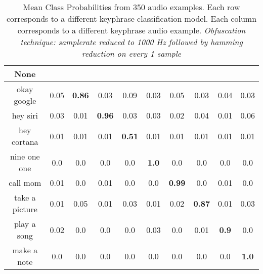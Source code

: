 \begin{table}[!th]
\begin{tabular}{cccccccccc}%
\hline%
None&\rotate{random talk}{70}&\rotate{okay google}{70}&\rotate{hey siri}{70}&\rotate{hey cortana}{70}&\rotate{nine one one}{70}&\rotate{call mom}{70}&\rotate{take a picture}{70}&\rotate{play a song}{70}&\rotate{make a note}{70}\\%
\hline%
okay google&0.05&\textbf{0.86}&0.03&0.09&0.03&0.05&0.03&0.04&0.03\\%
hey siri&0.03&0.01&\textbf{0.96}&0.03&0.03&0.02&0.04&0.01&0.06\\%
hey cortana&0.01&0.01&0.01&\textbf{0.51}&0.01&0.01&0.01&0.01&0.01\\%
nine one one&0.0&0.0&0.0&0.0&\textbf{1.0}&0.0&0.0&0.0&0.0\\%
call mom&0.01&0.0&0.01&0.0&0.0&\textbf{0.99}&0.0&0.01&0.0\\%
take a picture&0.01&0.05&0.01&0.03&0.01&0.02&\textbf{0.87}&0.01&0.03\\%
play a song&0.02&0.0&0.0&0.0&0.03&0.0&0.01&\textbf{0.9}&0.0\\%
make a note&0.0&0.0&0.0&0.0&0.0&0.0&0.0&0.0&\textbf{1.0}\\%
\hline%
\end{tabular}
\caption{Mean Class Probabilities from 350 audio examples. Each row corresponds to a different keyphrase classification model. Each column corresponds to a different keyphrase audio example. \emph{Obfuscation technique: samplerate reduced to 1000 Hz followed by hamming reduction on every 1 sample}}
\label{tab:probs_samplerate_1000_hamming_1}
\end{table}









